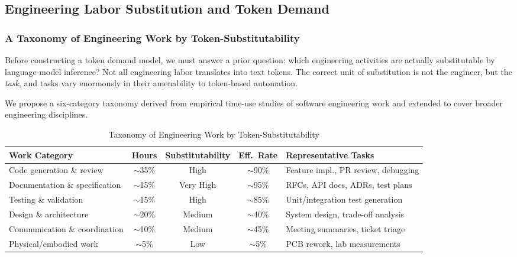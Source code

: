 \documentclass{article}
\begin{document}
\subsection{Engineering Labor Substitution and Token Demand}
\label{sec:token-demand}

\subsubsection{A Taxonomy of Engineering Work by Token-Substitutability}
\label{sec:taxonomy}

Before constructing a token demand model, we must answer a prior question: which
engineering activities are actually substitutable by language-model inference? Not all
engineering labor translates into text tokens. The correct unit of substitution is not
the engineer, but the \emph{task}, and tasks vary enormously in their amenability to
token-based automation.

We propose a six-category taxonomy derived from empirical time-use studies of software
engineering work \citep{meyer2019good,sadowski2019developers} and
extended to cover broader engineering disciplines.

\begin{table}[ht]
\centering
\caption{Taxonomy of Engineering Work by Token-Substitutability}
\label{tab:taxonomy}
\small
\begin{tabular}{@{}lcccp{3cm}@{}}
\toprule
\textbf{Work Category} & \textbf{Hours} & \textbf{Substitutability} & \textbf{Eff.\ Rate} & \textbf{Representative Tasks} \\
\midrule
Code generation \& review & $\sim$35\% & High & $\sim$90\% & Feature impl., PR review, debugging \\
Documentation \& specification & $\sim$15\% & Very High & $\sim$95\% & RFCs, API docs, ADRs, test plans \\
Testing \& validation & $\sim$15\% & High & $\sim$85\% & Unit/integration test generation \\
Design \& architecture & $\sim$20\% & Medium & $\sim$40\% & System design, trade-off analysis \\
Communication \& coordination & $\sim$10\% & Medium & $\sim$45\% & Meeting summaries, ticket triage \\
Physical/embodied work & $\sim$5\% & Low & $\sim$5\% & PCB rework, lab measurements \\
\bottomrule
\end{tabular}
\end{table}
\end{document}

